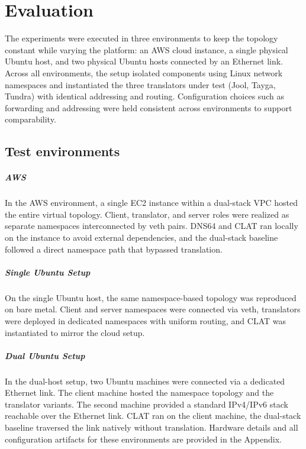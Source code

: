 \chapter{Evaluation}
The experiments were executed in three environments to keep the topology constant while varying the platform: an AWS cloud instance, a single physical Ubuntu host, and two physical Ubuntu hosts connected by an Ethernet link. Across all environments, the setup isolated components using Linux network namespaces and instantiated the three translators under test (Jool, Tayga, Tundra) with identical addressing and routing. Configuration choices such as forwarding and addressing were held consistent across environments to support comparability. 

\section{Test environments}
\paragraph{AWS}
In the AWS environment, a single EC2 instance within a dual-stack VPC hosted the entire virtual topology. Client, translator, and server roles were realized as separate namespaces interconnected by veth pairs\cite{veth4}. DNS64 and CLAT ran locally on the instance to avoid external dependencies, and the dual-stack baseline followed a direct namespace path that bypassed translation.

\paragraph{Single Ubuntu Setup }
On the single Ubuntu host, the same namespace-based topology was reproduced on bare metal. Client and server namespaces were connected via veth, translators were deployed in dedicated namespaces with uniform routing, and CLAT was instantiated to mirror the cloud setup. 
\paragraph{Dual Ubuntu Setup}
In the dual-host setup, two Ubuntu machines were connected via a dedicated Ethernet link. The client machine hosted the namespace topology and the translator variants. The second machine provided a standard IPv4/IPv6 stack reachable over the Ethernet link. CLAT ran on the client machine, the dual-stack baseline traversed the link natively without translation. Hardware details and all configuration artifacts for these environments are provided in the Appendix.

